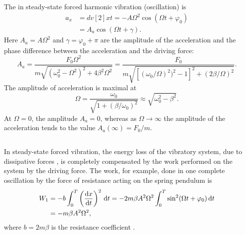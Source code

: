 \subsection{}\label{29.2.5} The  in steady-state forced harmonic vibration (oscillation) is
\begin{align*}%
a_{x} & = dv[2]{x}{t} = -A\Omega^{2} \cos (\Omega t + \varphi_{0}) \\
& = A_{a} \cos (\Omega t + \gamma).
\end{align*}
Here $A_{a} = A\Omega^{2}$ and $\gamma = \varphi_{0} + \pi$ are the amplitude of the acceleration and the phase difference between the acceleration and the driving force:
\begin{equation*}%
A_{a} = \frac{F_{0}\Omega^{2}}{m \sqrt{(\omega_{0}^{2} - \Omega^{2})^{2} + 4 \beta^{2}\Omega^{2}}} = \frac{F_{0}}{m \sqrt{[(\omega_{0}/\Omega)^{2})^{2} - 1]^{2} + (2\beta/\Omega)^{2}}}.
\end{equation*}
The amplitude of acceleration is maximal at 
\begin{equation*}%
\Omega = \frac{\omega_{0}}{\sqrt{1 + (\beta/\omega_{0})^{2}}}  \approx \sqrt{\omega_{0}^{2} - \beta^{2}}.
\end{equation*}
At $\Omega = 0$, the amplitude $A_{a} = 0$, whereas as $\Omega \to \infty$ the amplitude of the acceleration tends to the value $A_{a} (\infty) = F_{0}/m$.

\subsection{}\label{29.2.6} In steady-state forced vibration, the energy loss of the vibratory system, due to dissipative forces , is completely compensated by the work performed on the system by the driving force. The work, for example, done in one complete oscillation by the force of resistance acting on the spring pendulum is
\begin{align*}%
W_{1} & = -b \int_{0}^{T} \left( \dv{x}{t} \right)^{2} \, \dd t = - 2m \beta A^{2}\Omega^{2} \int_{0}^{T} \sin^{2} (\Omega t + \varphi_{0}) \, \dd t \\
& = -m\beta A^{2} \Omega^{2},
\end{align*}
where $b = 2 m \beta$ is the resistance coefficient .

